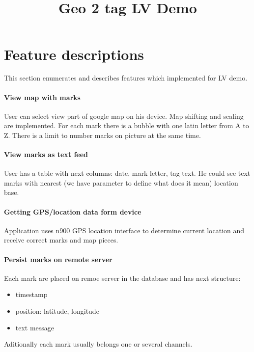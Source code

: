 \documentclass[12pt]{article}
\title{Geo 2 tag LV Demo}
\begin{document}
\maketitle          

\section{Feature descriptions}

This section enumerates and describes features which implemented
for LV demo. 

\paragraph{View map with marks}

User can select view part of google map on his device. Map shifting and scaling
are implemented. For each mark there is a bubble with one latin letter from 
A to Z. There is a limit to number marks on picture at the same time.

\paragraph{View marks as text feed}

User has a table with next columns: date, mark letter, tag text. He could see text marks
with nearest (we have parameter to define what does it mean) location base.

\paragraph{Getting GPS/location data form device}

Application uses n900 GPS location interface to determine current location and
receive correct marks and map pieces. 

\paragraph{Persist marks on remote server}

Each mark are placed on remoe server in the database and has next structure:
\begin{itemize}
  \item timestamp
  \item position: latitude, longitude
  \item text message
\end{itemize}

Aditionally each mark usually belongs one or several channels.
\end{document}
